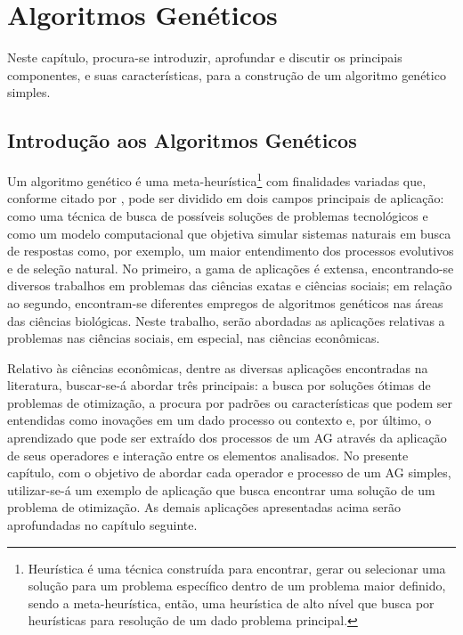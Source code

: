 \chapter{Algoritmos Genéticos}
\label{chap:altoritmos_geneticos}

Neste capítulo, procura-se introduzir, aprofundar e discutir os principais componentes, e suas características, para a construção de um algoritmo genético simples.

\section{Introdução aos Algoritmos Genéticos}
\label{sec:introducao_aos_algoritmos_geneticos}

Um algoritmo genético é uma meta-heurística\footnote{Heurística é uma técnica construída para encontrar, gerar ou selecionar uma solução para um problema específico dentro de um problema maior definido, sendo a meta-heurística, então, uma heurística de alto nível que busca por heurísticas para resolução de um dado problema principal.} com finalidades variadas que, conforme citado por \citet[pg.27]{MelanieMitchell98}, pode ser dividido em dois campos principais de aplicação: como uma técnica de busca de possíveis soluções de problemas tecnológicos e como um modelo computacional que objetiva simular sistemas naturais em busca de respostas como, por exemplo, um maior entendimento dos processos evolutivos e de seleção natural. No primeiro, a gama de aplicações é extensa, encontrando-se diversos trabalhos em problemas das ciências exatas e ciências sociais; em relação ao segundo, encontram-se diferentes empregos de algoritmos genéticos nas áreas das ciências biológicas. Neste trabalho, serão abordadas as aplicações relativas a problemas nas ciências sociais, em especial, nas ciências econômicas.

Relativo às ciências econômicas, dentre as diversas aplicações encontradas na literatura, buscar-se-á abordar três principais: a busca por soluções ótimas de problemas de otimização, a procura por padrões ou características que podem ser entendidas como inovações em um dado processo ou contexto e, por último, o aprendizado que pode ser extraído dos processos de um AG através da aplicação de seus operadores e interação entre os elementos analisados. No presente capítulo, com o objetivo de abordar cada operador e processo de um AG simples, utilizar-se-á um exemplo de aplicação que busca encontrar uma solução de um problema de otimização. As demais aplicações apresentadas acima serão aprofundadas no capítulo seguinte.

